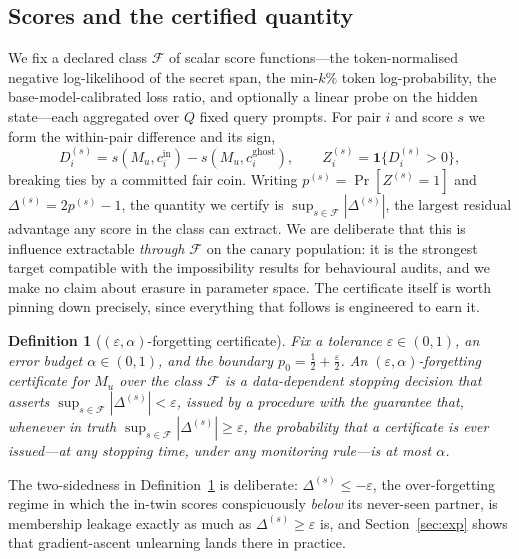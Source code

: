\documentclass[pdflatex,sn-mathphys-num]{sn-jnl}
\theoremstyle{thmstyleone}
\theoremstyle{thmstyletwo}
\theoremstyle{thmstylethree}
\newtheorem{definition}{Definition}
\newcommand{\F}{\mathcal{F}}
\newcommand{\eps}{\varepsilon}
\begin{document}
\subsection{Scores and the certified quantity}\label{sec:scores}

We fix a declared class $\F$ of
scalar score functions---the token-normalised negative log-likelihood of the secret
span, the min-$k\%$ token log-probability, the base-model-calibrated loss ratio, and
optionally a linear probe on the hidden state---each aggregated over $Q$ fixed query
prompts. For pair $i$ and score $s$ we form the within-pair difference and its sign,
\begin{equation}\label{eq:sign}
D_i^{(s)} = s(M_u, c_i^{\text{in}}) - s(M_u, c_i^{\text{ghost}}), \qquad
Z_i^{(s)} = \mathbf{1}\{D_i^{(s)} > 0\},
\end{equation}
breaking ties by a committed fair coin. Writing $p^{(s)} = \Pr[Z^{(s)} = 1]$ and
$\Delta^{(s)} = 2p^{(s)} - 1$, the quantity we certify is $\sup_{s\in\F}|\Delta^{(s)}|$,
the largest residual advantage any score in the class can extract. We are deliberate
that this is influence extractable \emph{through $\F$} on the canary population: it is
the strongest target compatible with the impossibility results for behavioural audits,
and we make no claim about erasure in parameter space. The certificate itself is worth
pinning down precisely, since everything that follows is engineered to earn it.

\begin{definition}[$(\eps,\alpha)$-forgetting certificate]\label{def:cert}
Fix a tolerance $\eps \in (0,1)$, an error budget $\alpha \in (0,1)$, and the boundary
$p_0 = \tfrac12 + \tfrac\eps2$. An $(\eps,\alpha)$-forgetting certificate for $M_u$
over the class $\F$ is a data-dependent stopping decision that asserts
$\sup_{s\in\F}|\Delta^{(s)}| < \eps$, issued by a procedure with the guarantee that,
whenever in truth $\sup_{s\in\F}|\Delta^{(s)}| \ge \eps$, the probability that a
certificate is \emph{ever} issued---at any stopping time, under any monitoring rule---is
at most $\alpha$.
\end{definition}

The two-sidedness in Definition~\ref{def:cert} is deliberate: $\Delta^{(s)} \le -\eps$,
the over-forgetting regime in which the in-twin scores conspicuously \emph{below} its
never-seen partner, is membership leakage exactly as much as $\Delta^{(s)} \ge \eps$
is, and Section~\ref{sec:exp} shows that gradient-ascent unlearning lands there in
practice.
\end{document}
